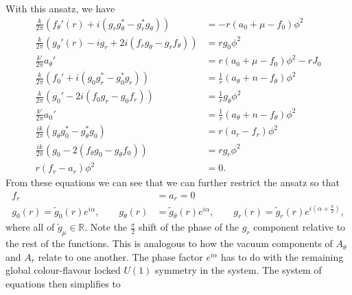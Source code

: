     With this ansatz, we have
    \begin{align}
        \frac{k}{2\pi} \left(f_{\theta}'(r) +i \left(g_r g_{\theta}^* - g_r^* g_{\theta} \right) \right) &= -r \left(a_0 +\mu - f_0 \right)\phi^2 \\
        \frac{k}{2 \pi} \left(g_{\theta}'(r) - i g_r +2i \left(f_r g_{\theta} -g_r f_{\theta} \right) \right) &=r g_0 \phi^2 \\
        \frac{k'}{2\pi} a_{\theta}' &= r \left(a_0 + \mu -f_0\right)\phi^2 -r J_0\\
        \frac{k}{2\pi} \left(f_0' + i \left(g_0 g_r^* - g_0^* g_r\right)\right)&= \frac{1}{r} \left(a_{\theta} + n - f_{\theta}\right)\phi^2\\
        \frac{k}{2\pi} \left(g_0' - 2i \left(f_0 g_r - g_0 f_r \right)\right) &= \frac{1}{r} g_{\theta} \phi^2\\
        \frac{k'}{2\pi} a_0' &=\frac{1}{r} \left(a_{\theta} +n - f_{\theta}\right) \phi^2 \\
        \frac{i k}{2\pi} \left(g_{\theta}g_0^* - g_{\theta}^* g_0\right) &= r \left(a_r -f_r\right) \phi^2 \\
        \frac{i k}{2\pi} \left(  g_0 - 2 \left(f_{\theta} g_0 - g_{\theta} f_0 \right)\right) &= r g_r \phi^2\\
        r \left(f_r -a_r\right) \phi^2 &= 0.
    \end{align}
    From these equations we can see that we can further restrict the ansatz so that
    \begin{align}
        f_r &=a_r = 0 \\
        g_0(r) = \tilde{g}_0(r) e^{i \alpha}, \qquad g_{\theta}(r) &= \tilde{g}_{\theta}(r) e^{i \alpha}, \qquad g_r(r) =  \tilde{g}_r(r) e^{i \left(\alpha + \frac{\pi}{2} \right)},
    \end{align}
    where all of $\tilde{g}_{\mu} \in \mathbb{R}$. Note the $\frac{\pi}{2}$ shift of the phase of the $g_r$ component relative to the rest of the functions. This is analogous to how the vacuum components of $A_{\theta}$ and $A_r$ relate to one another. The phase factor $e^{i \alpha}$ has to do with the remaining global colour-flavour locked $U(1)$ symmetry in the system.
    The system of equations then simplifies to
